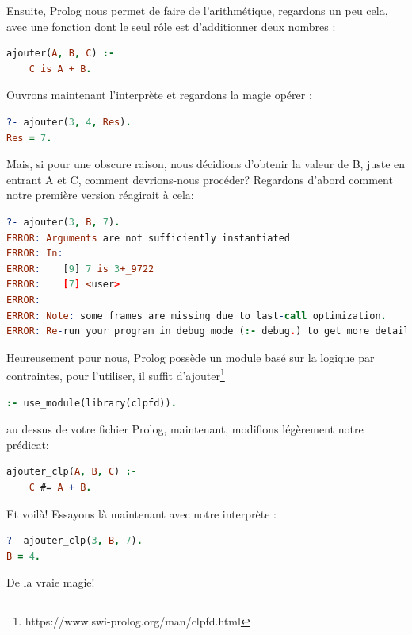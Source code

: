 \documentclass[a4paper, 12pt]{article}
\numberwithin{equation}{subsection}
\begin{document}
Ensuite, Prolog nous permet de faire de l'arithmétique, regardons un peu cela, avec une fonction dont le seul rôle est d'additionner deux nombres :
\begin{lstlisting}[language=Prolog]
ajouter(A, B, C) :-
    C is A + B.
\end{lstlisting}
Ouvrons maintenant l'interprète et regardons la magie opérer :
\begin{lstlisting}[language=Prolog]
?- ajouter(3, 4, Res).
Res = 7.
\end{lstlisting}
Mais, si pour une obscure raison, nous décidions d'obtenir la valeur de B, juste en entrant A et C, comment devrions-nous procéder? Regardons d'abord comment notre première version réagirait à cela:
\begin{lstlisting}[language=Prolog]
?- ajouter(3, B, 7).
ERROR: Arguments are not sufficiently instantiated
ERROR: In:
ERROR:    [9] 7 is 3+_9722
ERROR:    [7] <user>
ERROR:
ERROR: Note: some frames are missing due to last-call optimization.
ERROR: Re-run your program in debug mode (:- debug.) to get more detail.
\end{lstlisting}
Heureusement pour nous, Prolog possède un module basé sur la logique par contraintes, pour l'utiliser, il suffit d'ajouter\footnote{https://www.swi-prolog.org/man/clpfd.html}
\begin{lstlisting}[language=Prolog]
:- use_module(library(clpfd)).
\end{lstlisting}
au dessus de votre fichier Prolog, maintenant, modifions légèrement notre prédicat:
\begin{lstlisting}[language=Prolog]
ajouter_clp(A, B, C) :-
    C #= A + B.
\end{lstlisting}
Et voilà! Essayons là maintenant avec notre interprète :
\begin{lstlisting}[language=Prolog]
?- ajouter_clp(3, B, 7).
B = 4.
\end{lstlisting}
De la vraie magie!
\end{document}
